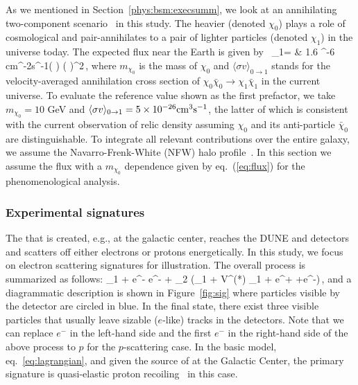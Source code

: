 As we mentioned in Section~\ref{phys:bsm:execsumm}, %
we look at an annihilating two-component  scenario~\cite{Belanger:2011ww} in this study. 
The heavier  (denoted $\chi_0$) plays a role of cosmological  and pair-annihilates to a pair of lighter  particles (denoted $\chi_1$) in the universe today. 
The expected flux near the Earth is given by~\cite{Agashe:2014yua, Giudice:2017zke, Kim:2018veo}
\bea 
{}_1= & 1.6 ^{-6} {\rm cm}^{-2}{\rm s}^{-1}\times \left( \right) 
 \times \left( \right)^2\,,
\label{eq:flux}
\eea
where $m_{\chi_0}$ is the mass of $\chi_0$ and $\langle \sigma v\rangle_{0\rightarrow 1}$ stands for the velocity-averaged annihilation cross section of $\chi_0\bar{\chi}_0 \to \chi_1\bar{\chi}_1$ in the current universe.
To evaluate the reference value shown as the first prefactor, we take $m_{\chi_0} = 10$ GeV and $\langle \sigma v\rangle_{0\rightarrow 1}=5\times 10^{-26}{\rm cm}^3{\rm s}^{-1}$, the latter of which is consistent with the current observation of  relic density assuming $\chi_0$ and its anti-particle $\bar{\chi}_0$ are distinguishable. 
To integrate all relevant contributions over the entire galaxy, we assume the Navarro-Frenk-White (NFW)  halo profile~\cite{Navarro:1995iw, Navarro:1996gj}.
In this section we assume the  flux with a $m_{\chi_0}$ dependence given by eq.~(\ref{eq:flux}) for the phenomenological analysis. 


\subsubsection{Experimental signatures}

The  that is created, e.g., at the galactic center, reaches the DUNE  and  detectors and scatters off either electrons or protons energetically. 
In this study, we focus on electron scattering signatures for illustration. 
The overall process is summarized as follows:
\bea 
\chi_1 + e^- \to e^- + \chi_2 (\to \chi_1 + V^{(*)} \to \chi_1 + e^+ +e^-)\,,
\eea
and a diagrammatic description is shown in Figure~\ref{fig:sig} where %
particles visible by the detector are circled in blue. %
In the final state, there exist three visible particles that usually leave sizable ($e$-like) tracks in the %
detectors.  
Note that we can replace $e^-$ in the left-hand side and the first $e^-$ in the right-hand side of the above process to $p$ for the $p$-scattering case.
In the basic model, eq.~\eqref{eq:lagrangian}, and given the source of  at the Galactic Center,  the primary signature is quasi-elastic proton recoiling~\cite{pscattering} in this case.


